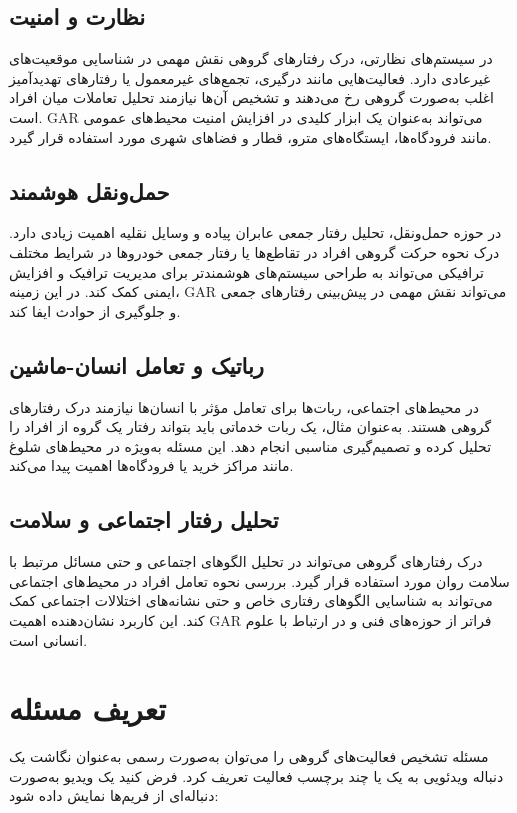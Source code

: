 \documentclass[12pt]{report}
\begin{document}
\subsection{نظارت و امنیت}
در سیستم‌های نظارتی، درک رفتارهای گروهی نقش مهمی در شناسایی موقعیت‌های غیرعادی دارد. فعالیت‌هایی مانند درگیری، تجمع‌های غیرمعمول یا رفتارهای تهدیدآمیز اغلب به‌صورت گروهی رخ می‌دهند و تشخیص آن‌ها نیازمند تحلیل تعاملات میان افراد است. GAR می‌تواند به‌عنوان یک ابزار کلیدی در افزایش امنیت محیط‌های عمومی مانند فرودگاه‌ها، ایستگاه‌های مترو، قطار و فضاهای شهری مورد استفاده قرار گیرد.

\subsection{حمل‌ونقل هوشمند}
در حوزه حمل‌ونقل، تحلیل رفتار جمعی عابران پیاده و وسایل نقلیه اهمیت زیادی دارد. درک نحوه حرکت گروهی افراد در تقاطع‌ها یا رفتار جمعی خودروها در شرایط مختلف ترافیکی می‌تواند به طراحی سیستم‌های هوشمندتر برای مدیریت ترافیک و افزایش ایمنی کمک کند. در این زمینه، GAR می‌تواند نقش مهمی در پیش‌بینی رفتارهای جمعی و جلوگیری از حوادث ایفا کند.

\subsection[رباتیک و تعامل انسان-ماشین]{رباتیک و تعامل انسان-ماشین}
در محیط‌های اجتماعی، ربات‌ها برای تعامل مؤثر با انسان‌ها نیازمند درک رفتارهای گروهی هستند. به‌عنوان مثال، یک ربات خدماتی باید بتواند رفتار یک گروه از افراد را تحلیل کرده و تصمیم‌گیری مناسبی انجام دهد. این مسئله به‌ویژه در محیط‌های شلوغ مانند مراکز خرید یا فرودگاه‌ها اهمیت پیدا می‌کند.

\subsection{تحلیل رفتار اجتماعی و سلامت}
درک رفتارهای گروهی می‌تواند در تحلیل الگوهای اجتماعی و حتی مسائل مرتبط با سلامت روان مورد استفاده قرار گیرد. بررسی نحوه تعامل افراد در محیط‌های اجتماعی می‌تواند به شناسایی الگوهای رفتاری خاص و حتی نشانه‌های اختلالات اجتماعی کمک کند. این کاربرد نشان‌دهنده اهمیت GAR فراتر از حوزه‌های فنی و در ارتباط با علوم انسانی است.

\section{تعریف مسئله}
مسئله تشخیص فعالیت‌های گروهی را می‌توان به‌صورت رسمی به‌عنوان نگاشت یک دنباله ویدئویی به یک یا چند برچسب فعالیت تعریف کرد. فرض کنید یک ویدیو به‌صورت دنباله‌ای از فریم‌ها نمایش داده شود:
\end{document}
